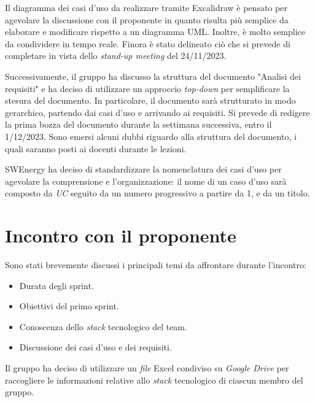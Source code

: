 Il diagramma dei casi d'uso da realizzare tramite Excalidraw è pensato per
agevolare la discussione con il proponente in quanto risulta più semplice da
elaborare e modificare rispetto a un diagramma UML. Inoltre, è molto
semplice da condividere in tempo reale. Finora è stato delineato ciò che si
prevede di completare in vista dello \textit{stand-up meeting} del 24/11/2023.

Successivamente, il gruppo ha discusso la struttura del documento "Analisi dei
requisiti" e ha deciso di utilizzare un approccio \textit{top-down} per
semplificare la stesura del documento. In particolare, il documento sarà
strutturato in modo gerarchico, partendo dai casi d'uso e arrivando ai
requisiti. Si prevede di redigere la prima bozza del documento durante la
settimana successiva, entro il 1/12/2023.
Sono emersi alcuni dubbi riguardo alla struttura del documento, i quali saranno
posti ai docenti durante le lezioni.

SWEnergy ha deciso di standardizzare la nomenclatura dei casi d'uso per
agevolare la comprensione e l'organizzazione: il nome di un caso d'uso sarà
composto da \textit{UC} seguito da un numero progressivo a partire da 1, e da
un titolo.

\section{Incontro con il proponente}

Sono stati brevemente discussi i principali temi da affrontare durante
l'incontro:

\begin{itemize}
	\item Durata degli sprint.
	\item Obiettivi del primo sprint.
	\item Conoscenza dello \textit{stack} tecnologico del team.
	\item Discussione dei casi d'uso e dei requisiti.
\end{itemize}

Il gruppo ha deciso di utilizzare un \textit{file} Excel condiviso su
\textit{Google Drive} per raccogliere le informazioni relative allo
\textit{stack} tecnologico di ciascun membro del gruppo.

